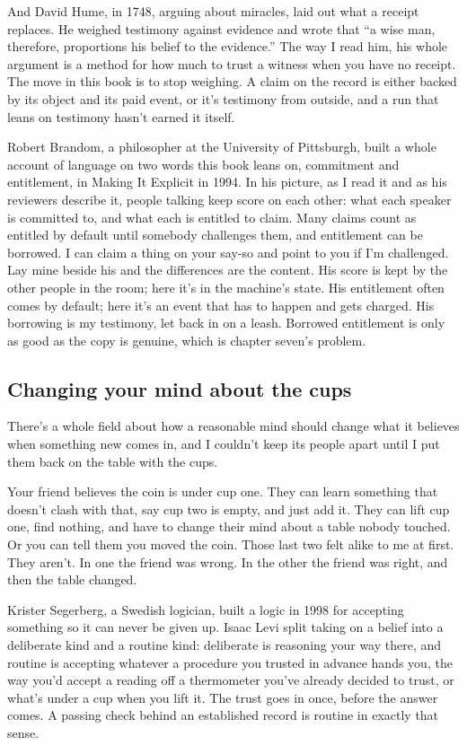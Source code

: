 \documentclass[11pt,twoside]{article}
\theoremstyle{thielethm}
\theoremstyle{thieledef}
\theoremstyle{thieledef}
\theoremstyle{thieledef}
\theoremstyle{thielethm}
\theoremstyle{thieleobs}
\theoremstyle{thielethm}
\begin{document}
And David Hume, in 1748, arguing about miracles, laid out what a receipt replaces. He weighed testimony against evidence and wrote that ``a wise man, therefore, proportions his belief to the evidence.'' The way I read him, his whole argument is a method for how much to trust a witness when you have no receipt. The move in this book is to stop weighing. A claim on the record is either backed by its object and its paid event, or it's testimony from outside, and a run that leans on testimony hasn't earned it itself.

Robert Brandom, a philosopher at the University of Pittsburgh, built a whole account of language on two words this book leans on, commitment and entitlement, in Making It Explicit in 1994. In his picture, as I read it and as his reviewers describe it, people talking keep score on each other: what each speaker is committed to, and what each is entitled to claim. Many claims count as entitled by default until somebody challenges them, and entitlement can be borrowed. I can claim a thing on your say-so and point to you if I'm challenged. Lay mine beside his and the differences are the content. His score is kept by the other people in the room; here it's in the machine's state. His entitlement often comes by default; here it's an event that has to happen and gets charged. His borrowing is my testimony, let back in on a leash. Borrowed entitlement is only as good as the copy is genuine, which is chapter seven's problem.

\subsection{Changing your mind about the cups}

There's a whole field about how a reasonable mind should change what it believes when something new comes in, and I couldn't keep its people apart until I put them back on the table with the cups.

Your friend believes the coin is under cup one. They can learn something that doesn't clash with that, say cup two is empty, and just add it. They can lift cup one, find nothing, and have to change their mind about a table nobody touched. Or you can tell them you moved the coin. Those last two felt alike to me at first. They aren't. In one the friend was wrong. In the other the friend was right, and then the table changed.

Krister Segerberg, a Swedish logician, built a logic in 1998 for accepting something so it can never be given up. Isaac Levi split taking on a belief into a deliberate kind and a routine kind: deliberate is reasoning your way there, and routine is accepting whatever a procedure you trusted in advance hands you, the way you'd accept a reading off a thermometer you've already decided to trust, or what's under a cup when you lift it. The trust goes in once, before the answer comes. A passing check behind an established record is routine in exactly that sense.
\end{document}
